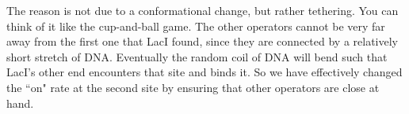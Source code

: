 \documentclass{article}
\begin{document}
The reason is not due to a conformational change, but rather tethering. You can think of it like the cup-and-ball game. The other operators cannot be very far away from the first one that LacI found, since they are connected by a relatively short stretch of DNA. Eventually the random coil of DNA will bend such that LacI's other end encounters that site and binds it. So we have effectively changed the ``on" rate at the second site by ensuring that other operators are close at hand.
\end{document}
